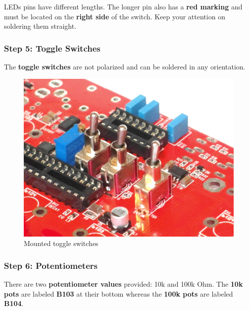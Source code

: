 \documentclass{scrartcl}
\begin{document}
LEDs pins have different lengths. The longer pin also has a \textbf{red marking} and must be located on the \textbf{right side} of the switch.
Keep your attention on soldering them straight.

\subsubsection{Step 5: Toggle Switches}

The \textbf{toggle switches} are not polarized and can be soldered in any orientation.

\begin{figure}[!ht]
    \begin{center}
        \includegraphics[scale=0.25]{assets/pcb-toggles.jpg}
        \caption{Mounted toggle switches}
    \end{center}
\end{figure}

\subsubsection{Step 6: Potentiometers}

There are two \textbf{potentiometer values} provided: 10k and 100k Ohm.
The \textbf{10k pots} are labeled \textbf{B103} at their bottom whereas the \textbf{100k pots} are labeled \textbf{B104}.
\end{document}
